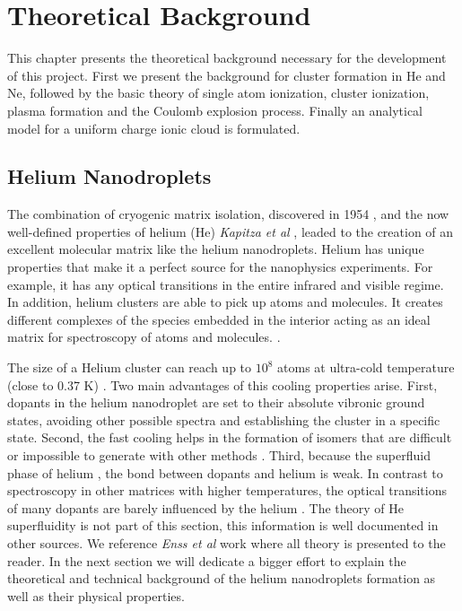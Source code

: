 \chapter{Theoretical Background}

This chapter presents the theoretical background necessary for the development of this project. First we present the background for cluster formation in He and Ne, followed by the basic theory of single atom ionization, cluster ionization, plasma formation and the Coulomb explosion process. Finally an analytical model for a uniform charge ionic cloud is formulated.

\section{Helium Nanodroplets}

The combination of cryogenic matrix isolation, discovered in 1954 \cite{whittle_matrix_1954}, and the now well-defined properties of helium (He) \textit{Kapitza et al} \cite{kapitza_viscosity_1938}, leaded to the creation of an excellent molecular matrix like the helium nanodroplets\cite{stienkemeier_spectroscopy_2006}.
Helium has unique properties that make it a perfect source for the nanophysics experiments. For example, it has any optical transitions in the entire infrared and visible regime\cite{atkins_liquid_2014}. In addition, helium clusters are able to pick up atoms and molecules. It creates different complexes of the species embedded in the interior acting as an ideal matrix for spectroscopy of atoms and molecules. \cite{stienkemeier_spectroscopy_2006}\cite{toennies_superfluid_2004}.

The size of a Helium cluster can reach up to $10^{8}$ atoms at ultra-cold temperature  (close to 0.37 K) \cite{toennies_spectroscopy_1998}\cite{enss_low-temperature_2005}.
Two main advantages of this cooling properties arise. First, dopants in the helium nanodroplet are set to their absolute vibronic ground states, avoiding other possible spectra and establishing the cluster in a specific state. Second, the fast cooling helps in the formation of isomers that are difficult or impossible to generate with other methods \cite{nauta_nonequilibrium_1999}. Third, because the superfluid phase of helium \cite{grebenev_superfluidity_1998}, the bond between dopants and helium is weak. In contrast to spectroscopy in other matrices with higher temperatures, the optical transitions of many dopants are barely influenced by the helium \cite{toennies_superfluid_2004}. 
The theory of He superfluidity is not part of this section, this information is well documented in other sources. We reference \textit{ Enss et al} work \cite{enss_low-temperature_2005} where all theory is presented to the reader. In the next section we will dedicate a bigger effort to explain the theoretical and technical background of the helium nanodroplets formation as well as their physical properties.

